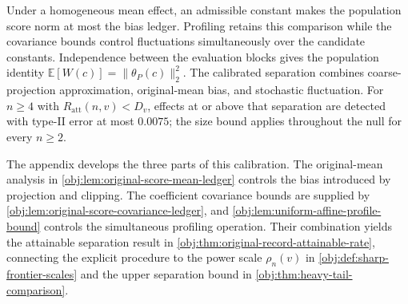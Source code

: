 Under a homogeneous mean effect, an admissible constant makes the population score norm at most the bias ledger. Profiling retains this comparison while the covariance bounds control fluctuations simultaneously over the candidate constants. Independence between the evaluation blocks gives the population identity \(\mathbb E[W(c)]=\|\theta_P(c)\|_2^2\). The calibrated separation combines coarse-projection approximation, original-mean bias, and stochastic fluctuation. For \(n\ge4\) with \(R_{\mathrm{att}}(n,v)<D_v\), effects at or above that separation are detected with type-II error at most \(0.0075\); the size bound applies throughout the null for every \(n\ge2\).

The appendix develops the three parts of this calibration. The original-mean analysis in \cref{obj:lem:original-score-mean-ledger} controls the bias introduced by projection and clipping. The coefficient covariance bounds are supplied by \cref{obj:lem:original-score-covariance-ledger}, and \cref{obj:lem:uniform-affine-profile-bound} controls the simultaneous profiling operation. Their combination yields the attainable separation result in \cref{obj:thm:original-record-attainable-rate}, connecting the explicit procedure to the power scale \(\rho_n(v)\) in \cref{obj:def:sharp-frontier-scales} and the upper separation bound in \cref{obj:thm:heavy-tail-comparison}.
